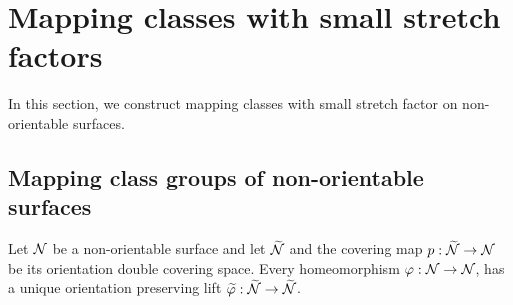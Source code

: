 \section{Mapping classes with small stretch factors}
\label{sec:mapping-classes-with}

In this section, we construct mapping classes with small stretch factor on non-orientable surfaces.

\subsection{Mapping class groups of non-orientable surfaces}
\label{sec:backgr-mapp-class}
Let $\mathcal{N}$ be a non-orientable surface and let $\widetilde{\mathcal{N}}$ and the covering map $p:\widetilde{\mathcal{N}}\rightarrow \mathcal{N}$ be its orientation double covering space.
Every homeomorphism $\varphi: \mathcal{N} \to \mathcal{N}$, has a unique orientation preserving lift $\widetilde{\varphi}: \widetilde{\mathcal{N}} \to \widetilde{\mathcal{N}}$.


